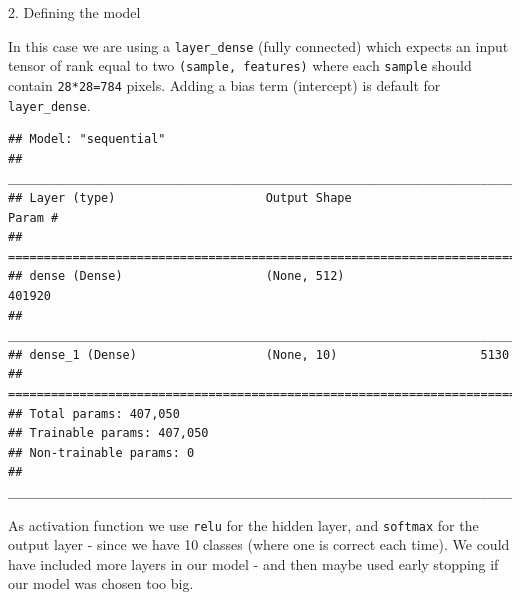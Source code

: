 \documentclass[10pt,ignorenonframetext,]{beamer}
\newenvironment{Shaded}{\begin{snugshade}}{\end{snugshade}}
\newcommand{\DataTypeTok}[1]{\textcolor[rgb]{0.13,0.29,0.53}{#1}}
\newcommand{\DecValTok}[1]{\textcolor[rgb]{0.00,0.00,0.81}{#1}}
\newcommand{\KeywordTok}[1]{\textcolor[rgb]{0.13,0.29,0.53}{\textbf{#1}}}
\newcommand{\NormalTok}[1]{#1}
\newcommand{\OperatorTok}[1]{\textcolor[rgb]{0.81,0.36,0.00}{\textbf{#1}}}
\newcommand{\StringTok}[1]{\textcolor[rgb]{0.31,0.60,0.02}{#1}}
\begin{document}
\begin{frame}[fragile]

\begin{block}{2. Defining the model}

In this case we are using a \texttt{layer\_dense} (fully connected)
which expects an input tensor of rank equal to two
\texttt{(sample,\ features)} where each \texttt{sample} should contain
\texttt{28*28=784} pixels. Adding a bias term (intercept) is default for
\texttt{layer\_dense}.

\scriptsize

\begin{Shaded}
\end{Shaded}

\begin{verbatim}
## Model: "sequential"
## ___________________________________________________________________________
## Layer (type)                     Output Shape                  Param #     
## ===========================================================================
## dense (Dense)                    (None, 512)                   401920      
## ___________________________________________________________________________
## dense_1 (Dense)                  (None, 10)                    5130        
## ===========================================================================
## Total params: 407,050
## Trainable params: 407,050
## Non-trainable params: 0
## ___________________________________________________________________________
\end{verbatim}

\normalsize

As activation function we use \texttt{relu} for the hidden layer, and
\texttt{softmax} for the output layer - since we have 10 classes (where
one is correct each time). We could have included more layers in our
model - and then maybe used early stopping if our model was chosen too
big.

\end{block}

\end{frame}
\end{document}
